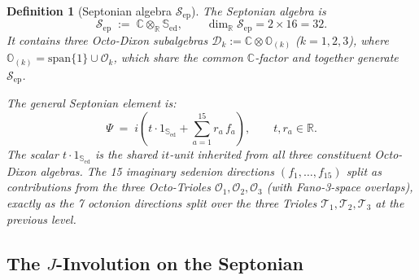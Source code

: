 \documentclass[12pt,a4paper]{article}
\newtheorem{definition}[theorem]{Definition}
\theoremstyle{remark}
\begin{document}
\begin{definition}[Septonian algebra $\mathcal{S}_{\mathrm{ep}}$]\label{def:septonian}
The \emph{Septonian algebra} is
\[
  \mathcal{S}_{\mathrm{ep}} \;:=\; \mathbb{C}\otimes_{\mathbb{R}}\mathbb{S}_{\mathrm{ed}},
  \qquad
  \dim_{\mathbb{R}}\mathcal{S}_{\mathrm{ep}} = 2\times 16 = 32.
\]
It contains three Octo-Dixon subalgebras
$\mathcal{D}_k := \mathbb{C}\otimes\mathbb{O}_{(k)}$
($k=1,2,3$), where $\mathbb{O}_{(k)}=\mathrm{span}\{1\}\cup\mathcal{O}_k$,
which share the common $\mathbb{C}$-factor and together generate $\mathcal{S}_{\mathrm{ep}}$.

The general \emph{Septonian element} is:
\[
\boxed{
  \Psi \;=\;
  i\!\left(t\cdot 1_{\mathbb{S}_{\mathrm{ed}}} + \sum_{a=1}^{15} r_a\,f_a\right),
  \qquad t,r_a\in\mathbb{R}.
}
\]
The scalar $t\cdot 1_{\mathbb{S}_{\mathrm{ed}}}$ is the shared $it$-unit inherited
from all three constituent Octo-Dixon algebras.
The 15 imaginary sedenion directions $(f_1,\ldots,f_{15})$ split
as contributions from the three Octo-Trioles $\mathcal{O}_1,\mathcal{O}_2,\mathcal{O}_3$
(with Fano-3-space overlaps), exactly as the 7 octonion directions
split over the three Trioles $\mathcal{T}_1,\mathcal{T}_2,\mathcal{T}_3$
at the previous level.
\end{definition}

\subsection*{The $J$-Involution on the Septonian}
\end{document}
